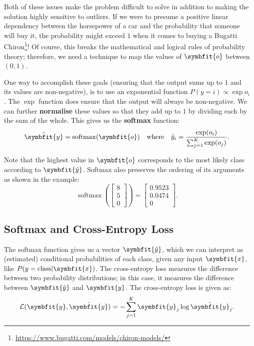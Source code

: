 Both of these issues make the problem difficult to solve in addition to making the solution highly sensitive to outliers. If we were to presume a positive linear dependency between the horsepower of a car and the probability that someone will buy it, the probability might exceed $1$ when it comes to buying a Bugatti Chiron\footnote{\url{https://www.bugatti.com/models/chiron-models/}}! Of course, this breaks the mathematical and logical rules of probability theory; therefore, we need a technique to map the values of $\symbfit{o}$ between $(0, 1)$.

One way to accomplish these goals (ensuring that the output sums up to $1$ and its values are non-negative), is to use an exponential function $P(y = i) \propto \exp o_i$. The $\exp$ function does ensure that the output will always be non-negative. We can further \textbf{normalise} these values so that they add up to $1$ by dividing each by the sum of the whole. This gives us the \textbf{softmax} function:
\begin{equation}
    \hat{\symbfit{y}} = \operatorname{softmax}(\symbfit{o}) \quad \text{where}\quad \hat{y}_i = \frac{\exp(o_i)}{\sum_{j=1}^{K} \exp(o_j)}.
    \label{eqn:std-softmax}
\end{equation}

Note that the highest value in $\symbfit{o}$ corresponds to the most likely class according to $\symbfit{\hat{y}}$. Softmax also preserves the ordering of its arguments as shown in the example:
\begin{equation}
    \nonumber
    \operatorname{softmax} \left(\begin{bmatrix}
    8\\
    5\\
    0
    \end{bmatrix}\right)
    = 
    \begin{bmatrix}
    0.9523\\
    0.0474\\
    0
    \end{bmatrix}.
\end{equation}

\subsection{Softmax and Cross-Entropy Loss}\label{ssec:ce-loss}

The softmax function gives us a vector $\symbfit{\hat{y}}$, which we can interpret as (estimated) conditional probabilities of each class, given any input $\symbfit{x}$, like $P(y=\text{class} | \symbfit{x})$. 
The cross-entropy loss measures the difference between two probability distributions; in this case, it measures the difference between $\symbfit{\hat{y}}$ and $\symbfit{y}$. The cross-entropy loss is given as:
\begin{equation}\label{eqn:ce-loss}
    \mathcal{L}(\symbfit{y}, \hat{\symbfit{y}}) = - \sum_{j=1}^K \symbfit{y}_j \log \hat{\symbfit{y}}_j.
\end{equation}

